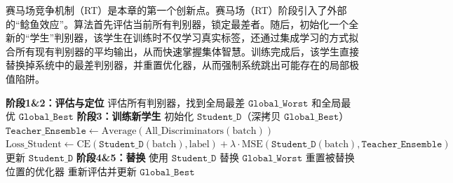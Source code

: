         
赛马场竞争机制（RT）是本章的第一个创新点。赛马场（RT）阶段引入了外部的“鲶鱼效应”。算法首先评估当前所有判别器，锁定最差者。随后，初始化一个全新的“学生”判别器，该学生在训练时不仅学习真实标签，还通过集成学习的方式拟合所有现有判别器的平均输出，从而快速掌握集体智慧。训练完成后，该学生直接替换掉系统中的最差判别器，并重置优化器，从而强制系统跳出可能存在的局部极值陷阱。

\begin{algorithm}[H]
\caption{赛马场竞争机制（RT）算法流程}
\label{alg:racetrack}
\begin{algorithmic}[0]
\State \textbf{阶段1\&2：评估与定位}
\State 评估所有判别器，找到全局最差 $\texttt{Global\_Worst}$ 和全局最优 $\texttt{Global\_Best}$
\Statex
\State \textbf{阶段3：训练新学生}
\State 初始化 $\texttt{Student\_D}$（深拷贝 $\texttt{Global\_Best}$）
    \State $\texttt{Teacher\_Ensemble} \gets \text{Average}(\text{All\_Discriminators}(\text{batch}))$
    \State $\text{Loss\_Student} \gets \text{CE}(\texttt{Student\_D}(\text{batch}), \text{label}) + \lambda \cdot \text{MSE}(\texttt{Student\_D}(\text{batch}), \texttt{Teacher\_Ensemble})$
    \State 更新 $\texttt{Student\_D}$
\EndFor
\Statex
\State \textbf{阶段4\&5：替换}
\State 使用 $\texttt{Student\_D}$ 替换 $\texttt{Global\_Worst}$
\State 重置被替换位置的优化器
\State 重新评估并更新 $\texttt{Global\_Best}$
\end{algorithmic}
\end{algorithm}

